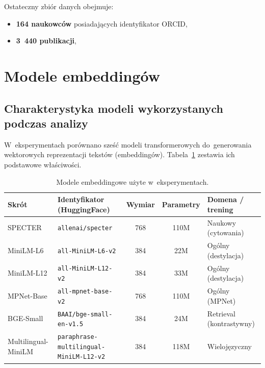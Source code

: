 Ostateczny zbiór danych obejmuje:
\begin{itemize}
    \item \textbf{164 naukowców} posiadających identyfikator ORCID,
    \item \textbf{3~440 publikacji},
\end{itemize}


\section{Modele embeddingów}
\label{sec:models}

\subsection{Charakterystyka modeli wykorzystanych podczas analizy}
\label{subsec:models_overview}

W~eksperymentach porównano sześć modeli transformerowych
do~generowania wektorowych reprezentacji tekstów (embeddingów).
Tabela~\ref{tab:models_full} zestawia ich podstawowe właściwości.

\begin{table}[H]
\centering
\caption{Modele embeddingowe użyte w~eksperymentach.}
\label{tab:models_full}
\begin{tabular}{llccp{3.2cm}}
\toprule
\textbf{Skrót} & \textbf{Identyfikator (HuggingFace)} & \textbf{Wymiar} & \textbf{Parametry} & \textbf{Domena / trening} \\
\midrule
SPECTER            & \texttt{allenai/specter}                        & 768 & 110M & Naukowy (cytowania) \\
MiniLM-L6          & \texttt{all-MiniLM-L6-v2}                       & 384 & 22M  & Ogólny (destylacja) \\
MiniLM-L12         & \texttt{all-MiniLM-L12-v2}                      & 384 & 33M  & Ogólny (destylacja) \\
MPNet-Base         & \texttt{all-mpnet-base-v2}                      & 768 & 110M & Ogólny (MPNet) \\
BGE-Small          & \texttt{BAAI/bge-small-en-v1.5}                 & 384 & 24M  & Retrieval (kontrastywny) \\
Multilingual-MiniLM & \texttt{paraphrase-multilingual-MiniLM-L12-v2} & 384 & 118M & Wielojęzyczny \\
\bottomrule
\end{tabular}
\end{table}


